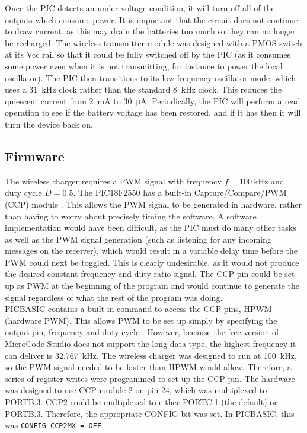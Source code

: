 Once the PIC detects an under-voltage condition, it will turn off all of the outputs which consume power. It is important that the circuit does not continue to draw current, as this may drain the batteries too much so they can no longer be recharged. The wireless transmitter module was designed with a PMOS switch at its Vcc rail so that it could be fully switched off by the PIC (as it consumes some power even when it is not transmitting, for instance to power the local oscillator). The PIC then transitions to its low frequency oscillator mode, which uses a \SI{31}{\kilo\hertz} clock rather than the standard \SI{8}{\kilo\hertz} clock. This reduces the quiescent current from \SI{2}{\milli\ampere} to \SI{30}{\micro\ampere}. Periodically, the PIC will perform a read operation to see if the battery voltage has been restored, and if it has then it will turn the device back on.\\






\subsection{Firmware}
The wireless charger requires a PWM signal with frequency $f=\SI{100}{\kilo\hertz}$ and duty cycle $D=0.5$. The PIC18F2550 has a built-in Capture/Compare/PWM (CCP) module \cite{pic18f2550}. This allows the PWM signal to be generated in hardware, rather than having to worry about precisely timing the software. A software implementation would have been difficult, as the PIC must do many other tasks as well as the PWM signal generation (such as listening for any incoming messages on the receiver), which would result in a variable delay time before the PWM could next be toggled. This is clearly undesirable, as it would not produce the desired constant frequency and duty ratio signal. The CCP pin could be set up as PWM at the beginning of the program and would continue to generate the signal regardless of what the rest of the program was doing.\\

PICBASIC contains a built-in command to access the CCP pins, HPWM (hardware PWM). This allows PWM to be set up simply by specifying the output pin, frequency and duty cycle \cite{picbasic_pro}. However, because the free version of MicroCode Studio does not support the long data type, the highest frequency it can deliver is \SI{32.767}{\kilo\hertz}. The wireless charger was designed to run at \SI{100}{\kilo\hertz}, so the PWM signal needed to be faster than HPWM would allow. Therefore, a series of register writes were programmed to set up the CCP pin. The hardware was designed to use CCP module 2 on pin 24, which was multiplexed to PORTB.3. CCP2 could be multiplexed to either PORTC.1 (the default) or PORTB.3. Therefore, the appropriate CONFIG bit was set. In PICBASIC, this was \verb|CONFIG CCP2MX = OFF|.\\


